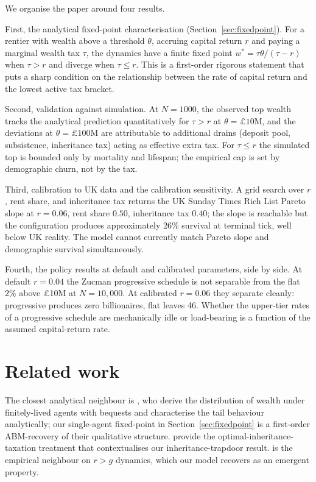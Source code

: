 \documentclass[11pt]{article}
\begin{document}
We organise the paper around four results.

First, the analytical fixed-point characterisation
(Section~\ref{sec:fixedpoint}).  For a rentier with wealth above a
threshold $\theta$, accruing capital return $r$ and paying a
marginal wealth tax $\tau$, the dynamics have a finite fixed point
$w^* = \tau \theta / (\tau - r)$ when $\tau > r$ and diverge when
$\tau \leq r$.  This is a first-order rigorous statement that puts a
sharp condition on the relationship between the rate of capital
return and the lowest active tax bracket.

Second, validation against simulation.  At $N = 1000$, the observed
top wealth tracks the analytical prediction quantitatively for
$\tau > r$ at $\theta = \pounds 10\text{M}$, and the deviations at
$\theta = \pounds 100\text{M}$ are attributable to additional drains
(deposit pool, subsistence, inheritance tax) acting as effective
extra tax.  For $\tau \leq r$ the simulated top is bounded only by
mortality and lifespan; the empirical cap is set by demographic
churn, not by the tax.

Third, calibration to UK data and the calibration sensitivity.  A
grid search over $r$, rent share, and inheritance tax returns the
UK Sunday Times Rich List Pareto slope at $r = 0.06$, rent share
$0.50$, inheritance tax $0.40$; the slope is reachable but the
configuration produces approximately 26\% survival at terminal tick,
well below UK reality.  The model cannot currently match Pareto
slope and demographic survival simultaneously.

Fourth, the policy results at default and calibrated parameters,
side by side.  At default $r = 0.04$ the Zucman progressive
schedule is not separable from the flat $2\%$ above \pounds 10M at
$N = 10{,}000$.  At calibrated $r = 0.06$ they separate cleanly:
progressive produces zero billionaires, flat leaves 46.  Whether the
upper-tier rates of a progressive schedule are mechanically idle or
load-bearing is a function of the assumed capital-return rate.

\section{Related work}
\label{sec:related}

The closest analytical neighbour is \citet{benhabib2011distribution},
who derive the distribution of wealth under finitely-lived agents with
bequests and characterise the tail behaviour analytically; our
single-agent fixed-point in Section~\ref{sec:fixedpoint} is a
first-order ABM-recovery of their qualitative structure.
\citet{piketty2013theory} provide the optimal-inheritance-taxation
treatment that contextualises our inheritance-trapdoor result.
\citet{piketty2014capital} is the empirical neighbour on $r > g$
dynamics, which our model recovers as an emergent property.
\end{document}
